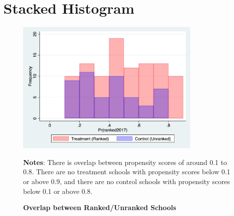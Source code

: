 \documentclass{article}
\begin{document}
\section{Stacked Histogram}
\begin{figure}[htbp]

\caption{\textbf{Overlap between Ranked/Unranked Schools}
\label{tab:EngApproach}}
\center
	\includegraphics[width=90mm]{histogram.jpg}
    \center
    \begin{footnotesize}
    \textbf{Notes}: There is overlap between propensity scores of around 0.1 to 0.8. There are no treatment schools with propensity scores below 0.1 or above 0.9, and there are no control schools with propensity scores below 0.1 or above 0.8.
    \end{footnotesize}
\end{figure}
\newpage
\end{document}
